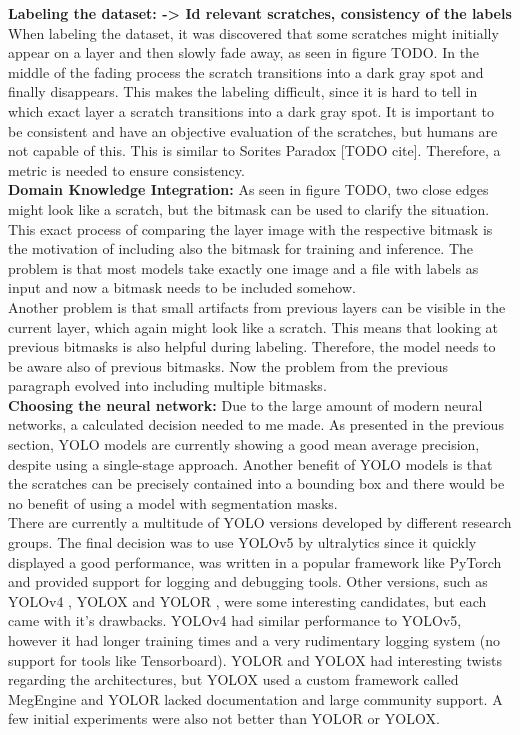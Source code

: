 \textbf{Labeling the dataset: -> Id relevant scratches, consistency of the labels}
When labeling the dataset, it was discovered that some scratches might initially appear on a layer and then slowly fade away, as seen in figure TODO. In the middle of the fading process the scratch transitions into a dark gray spot and finally disappears. This makes the labeling difficult, since it is hard to tell in which exact layer a scratch transitions into a dark gray spot.
It is important to be consistent and have an objective evaluation of the scratches, but humans are not capable of this. This is similar to Sorites Paradox [TODO cite]. Therefore, a metric is needed to ensure consistency.\\


\textbf{Domain Knowledge Integration:}
As seen in figure TODO, two close edges might look like a scratch, but the bitmask can be used to clarify the situation. This exact process of comparing the layer image with the respective bitmask is the motivation of including also the bitmask for training and inference. The problem is that most models take exactly one image and a file with labels as input and now a bitmask needs to be included somehow.\\
Another problem is that small artifacts from previous layers can be visible in the current layer, which again might look like a scratch. This means that looking at previous bitmasks is also helpful during labeling. Therefore, the model needs to be aware also of previous bitmasks. Now the problem from the previous paragraph evolved into including multiple bitmasks. \\


\textbf{Choosing the neural network:}
Due to the large amount of modern neural networks, a calculated decision needed to me made. As presented in the previous section, YOLO models are currently showing a good mean average precision, despite using a single-stage approach. Another benefit of YOLO models is that the scratches can be precisely contained into a bounding box and there would be no benefit of using a model with segmentation masks. \\
There are currently a multitude of YOLO versions developed by different research groups. The final decision was to use YOLOv5 by ultralytics \cite{yolov5_git} since it quickly displayed a good performance, was written in a popular framework like PyTorch and provided support for logging and debugging tools. Other versions, such as YOLOv4 \cite{yolov4_paper}, YOLOX \cite{yolox_paper} and YOLOR \cite{yolor_paper}, were some interesting candidates, but each came with it's drawbacks. YOLOv4 had similar performance to YOLOv5, however it had longer training times and a very rudimentary logging system (no support for tools like Tensorboard). YOLOR and YOLOX had interesting twists regarding the architectures, but YOLOX used a custom framework called MegEngine \cite{megengine_git} and YOLOR lacked documentation and large community support. A few initial experiments were also not better than YOLOR or YOLOX. \\


